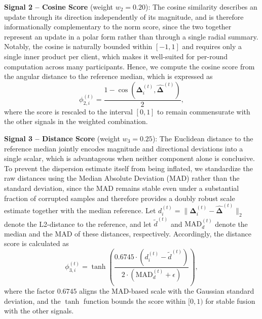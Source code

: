 \textbf{Signal 2 -- Cosine Score} (weight $w_2 = 0.20$): The cosine similarity describes an update through its direction independently of its magnitude, and is therefore informationally complementary to the norm score, since the two together represent an update in a polar form rather than through a single radial summary. Notably, the cosine is naturally bounded within $[-1, 1]$ and requires only a single inner product per client, which makes it well-suited for per-round computation across many participants. Hence, we compute the cosine score from the angular distance to the reference median, which is expressed as
\begin{equation}\label{eq:cos_score}
    \phi_{2,i}^{(t)} = \frac{1 - \cos(\boldsymbol{\Delta}_i^{(t)}, \hat{\boldsymbol{\Delta}}^{(t)})}{2},
\end{equation}
where the score is rescaled to the interval $[0, 1]$ to remain commensurate with the other signals in the weighted combination.

\textbf{Signal 3 -- Distance Score} (weight $w_3 = 0.25$): The Euclidean distance to the reference median jointly encodes magnitude and directional deviations into a single scalar, which is advantageous when neither component alone is conclusive. To prevent the dispersion estimate itself from being inflated, we standardize the raw distances using the Median Absolute Deviation (MAD) rather than the standard deviation, since the MAD remains stable even under a substantial fraction of corrupted samples and therefore provides a doubly robust scale estimate together with the median reference. Let $d_i^{(t)} = \|\boldsymbol{\Delta}_i^{(t)} - \hat{\boldsymbol{\Delta}}^{(t)}\|_2$ denote the L2-distance to the reference, and let $\tilde{d}^{(t)}$ and $\text{MAD}_d^{(t)}$ denote the median and the MAD of these distances, respectively. Accordingly, the distance score is calculated as
\begin{equation}\label{eq:dist_score}
    \phi_{3,i}^{(t)} = \tanh\left(\frac{0.6745 \cdot (d_i^{(t)} - \tilde{d}^{(t)})}{2 \cdot (\text{MAD}_d^{(t)} + \epsilon)}\right),
\end{equation}
where the factor $0.6745$ aligns the MAD-based scale with the Gaussian standard deviation, and the $\tanh$ function bounds the score within $[0, 1)$ for stable fusion with the other signals.

